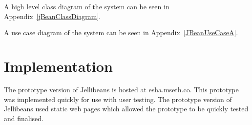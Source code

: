 \documentclass[a4paper, 11pt]{article}
\begin{document}
\vspace{5mm}
A high level class diagram of the system can be seen in Appendix~\ref{jBeanClassDiagram}.

\vspace{5mm}
A use case diagram of the system can be seen in Appendix~\ref{JBeanUseCaseA}.

\section{Implementation}
The prototype version of Jellibeans is hosted at esha.mseth.co. This prototype was implemented quickly for use with user testing. The prototype version of Jellibeans used static web pages which allowed the prototype to be quickly tested and finalised.
\end{document}
